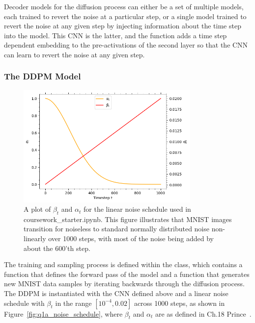 Decoder models for the diffusion process can either be a set of multiple models, each trained to revert the noise at
a particular step, or a single model trained to revert the noise at any given step by injecting information about the
time step into the model.
This CNN is the latter, and the  function adds a time step dependent embedding to the pre-activations
of the second layer so that the CNN can learn to revert the noise at any given step.

\subsubsection{The DDPM Model}\label{subsubsec:ddpm-model}
\begin{figure}[t]
    \centering
    \includegraphics[width=0.8\textwidth]{figures/q1a_noise_schedule}
    \caption{A plot of $\beta_{t}$ and $\alpha_{t}$ for the linear noise schedule used in coursework\_starter.ipynb.
        This figure illustrates that MNIST images transition for noiseless to standard normally distributed noise non-linearly
        over 1000 steps, with most of the noise being added by about the 600'th step.}
    \label{fig:q1a_noise_schedule}
\end{figure}

The training and sampling process is defined within the  class, which contains a 
function that defines the forward pass of the model and a
 function that generates new MNIST data samples by iterating backwards through the diffusion process.
The DDPM is instantiated with the CNN defined above and a linear noise schedule with $\beta_{t}$ in the range $[10^{-4},
0.02]$ across 1000 steps, as shown in Figure~\eqref{fig:q1a_noise_schedule}, where $\beta_{t}$ and $\alpha_{t}$ are as
defined in Ch.18 Prince~\cite{prince}.

